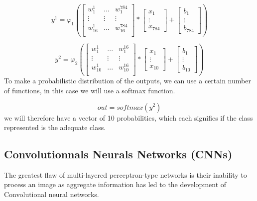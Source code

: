 \documentclass[twoside,twocolumn]{article}
\begin{document}
\[
y^1 = \varphi_1(
\left[
  \begin{array}{ccc}
    w_{1}^{1} & ... & w_{1}^{784}\\
    \vdots & \vdots & \vdots\\
    w_{16}^{1} & ... & w_{16}^{784}\\
  \end{array}
\right]*
\begin{bmatrix}
           x_{1} \\
           \vdots \\
           x_{784}
         \end{bmatrix}
+ \begin{bmatrix}
  b_{1} \\
  \vdots \\
  b_{784}
\end{bmatrix}
)\]

\[
y^2 = \varphi_2(
\left[
  \begin{array}{ccc}
    w_{1}^{1} & ... & w_{1}^{16}\\
    \vdots & \vdots & \vdots\\
    w_{10}^{1} & ... & w_{10}^{16}\\  
  \end{array}
\right]*
\begin{bmatrix}
           x_{1} \\
           \vdots \\
           x_{10}
         \end{bmatrix}
+ \begin{bmatrix}
  b_{1} \\
  \vdots \\
  b_{10}
\end{bmatrix}
)\]
To make a probabilistic distribution of the outputs, we can use a certain number of functions, in this case we will use a softmax function.

\[
out = softmax(y^2)
\]
we will therefore have a vector of 10 probabilities, which each signifies if the class represented is the adequate class.


\subsection{Convolutionnals Neurals Networks (CNNs)}
The greatest flaw of multi-layered perceptron-type networks is their inability to process an image as aggregate information has led to the 
development of Convolutional neural networks.
\end{document}

